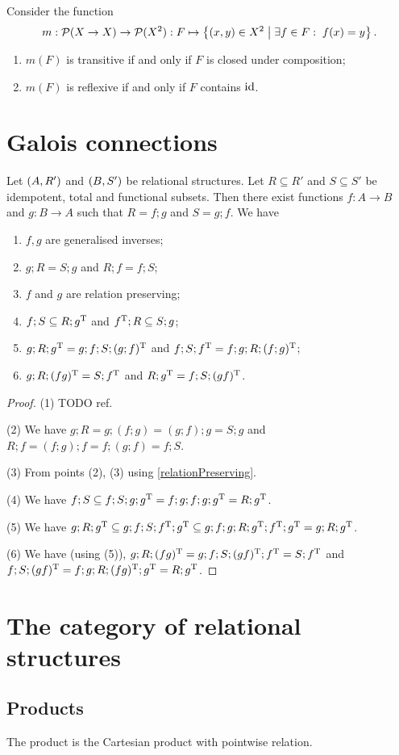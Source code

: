 \begin{proposition}
Consider the function
\[ m: \operatorname{\mathcal{P}}(X\to X) \to \operatorname{\mathcal{P}}(X^2): F \mapsto \left\{ (x,y)\in X^2 \;\middle|\; \exists f\in F: \; f(x) = y \right\}. \]
\begin{enumerate}
\item $m(F)$ is transitive \textup{if and only if} $F$ is closed under composition;
\item $m(F)$ is reflexive \textup{if and only if} $F$ contains $\operatorname{id}$.
\end{enumerate}
\end{proposition}

\section{Galois connections}
\begin{proposition}
Let $\left( A,R' \right)$ and $\left( B, S' \right)$ be relational structures. Let $R\subseteq R'$ and $S\subseteq S'$ be idempotent, total and functional subsets. Then there exist functions $f: A\to B$ and $g: B\to A$ such that $R = f;g$ and $S = g;f$. We have
\begin{enumerate}
\item $f,g$ are generalised inverses;
\item $g;R = S;g$ and $R;f = f;S$;
\item $f$ and $g$ are relation preserving;
\item $f;S \subseteq R;g^{\mathrm{T}}$ and $f^{\mathrm{T}} ;R \subseteq S;g$;
\item $g;R;g^{\mathrm{T}} = g;f;S;(g;f)^{\mathrm{T}}$ and $f;S;f^{\mathrm{T}} = f;g;R;(f;g)^{\mathrm{T}}$;
\item $g;R;(fg)^{\mathrm{T}} = S;f^{\mathrm{T}}$ and $R;g^{\mathrm{T}} = f;S;(gf)^{\mathrm{T}}$.
\end{enumerate}
\end{proposition}
\begin{proof}
(1) TODO ref.

(2) We have $g;R = g;(f;g) = (g;f);g = S;g$ and  $R;f = (f;g);f = f;(g;f) = f;S$.

(3) From points (2), (3) using \ref{relationPreserving}.

(4) We have $f;S \subseteq f;S;g;g^{\mathrm{T}} = f;g;f;g;g^{\mathrm{T}} = R;g^{\mathrm{T}}$.

(5) We have $g;R;g^{\mathrm{T}} \subseteq g;f;S;f^{\mathrm{T}};g^{\mathrm{T}} \subseteq g;f;g;R;g^{\mathrm{T}}; f^{\mathrm{T}}; g^{\mathrm{T}} = g;R;g^{\mathrm{T}}$.

(6) We have (using (5)), $g;R;(fg)^{\mathrm{T}} = g;f;S;(gf)^{\mathrm{T}};f^{\mathrm{T}} = S;f^{\mathrm{T}}$ and $f;S;(gf)^{\mathrm{T}} = f;g;R;(fg)^{\mathrm{T}}; g^{\mathrm{T}} = R;g^{\mathrm{T}}$.
\end{proof}

\section{The category of relational structures}
\subsection{Products}
\begin{proposition}
The product is the Cartesian product with pointwise relation.
\end{proposition}

